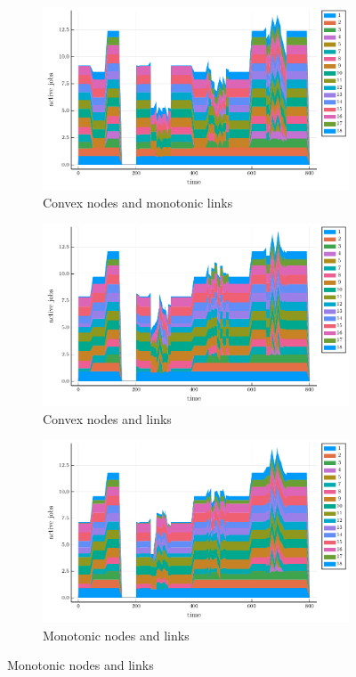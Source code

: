 \begin{figure}[tb]
  \centering
  \begin{subfigure}{\columnwidth}
      \includegraphics[width=\textwidth]{complex-convex-monotonic.pdf}
      \caption{Convex nodes and monotonic links}
      \label{fig:first}
  \end{subfigure}

  \begin{subfigure}{\columnwidth}
      \includegraphics[width=\textwidth]{complex-full-convex.pdf}
      \caption{Convex nodes and links}
      \label{fig:second}
  \end{subfigure}

  \begin{subfigure}{\columnwidth}
      \includegraphics[width=\textwidth]{complex-full-monotonic.pdf}
      \caption{Monotonic nodes and links}
      \label{fig:third}
  \end{subfigure}


\end{figure}
